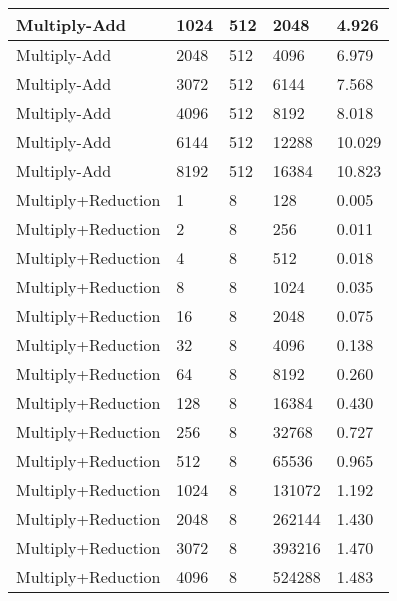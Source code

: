 \documentclass{article}
\begin{document}
\begin{longtable}{|l|l|l|l|l|}
Multiply-Add       & 1024 & 512         & 2048              & 4.926             \\ \hline
Multiply-Add       & 2048 & 512         & 4096              & 6.979             \\ \hline
Multiply-Add       & 3072 & 512         & 6144              & 7.568             \\ \hline
Multiply-Add       & 4096 & 512         & 8192              & 8.018             \\ \hline
Multiply-Add       & 6144 & 512         & 12288             & 10.029            \\ \hline
Multiply-Add       & 8192 & 512         & 16384             & 10.823            \\ \hline
Multiply+Reduction & 1    & 8           & 128               & 0.005             \\ \hline
Multiply+Reduction & 2    & 8           & 256               & 0.011             \\ \hline
Multiply+Reduction & 4    & 8           & 512               & 0.018             \\ \hline
Multiply+Reduction & 8    & 8           & 1024              & 0.035             \\ \hline
Multiply+Reduction & 16   & 8           & 2048              & 0.075             \\ \hline
Multiply+Reduction & 32   & 8           & 4096              & 0.138             \\ \hline
Multiply+Reduction & 64   & 8           & 8192              & 0.260             \\ \hline
Multiply+Reduction & 128  & 8           & 16384             & 0.430             \\ \hline
Multiply+Reduction & 256  & 8           & 32768             & 0.727             \\ \hline
Multiply+Reduction & 512  & 8           & 65536             & 0.965             \\ \hline
Multiply+Reduction & 1024 & 8           & 131072            & 1.192             \\ \hline
Multiply+Reduction & 2048 & 8           & 262144            & 1.430             \\ \hline
Multiply+Reduction & 3072 & 8           & 393216            & 1.470             \\ \hline
Multiply+Reduction & 4096 & 8           & 524288            & 1.483             \\ \hline

\end{longtable}
\end{document}
